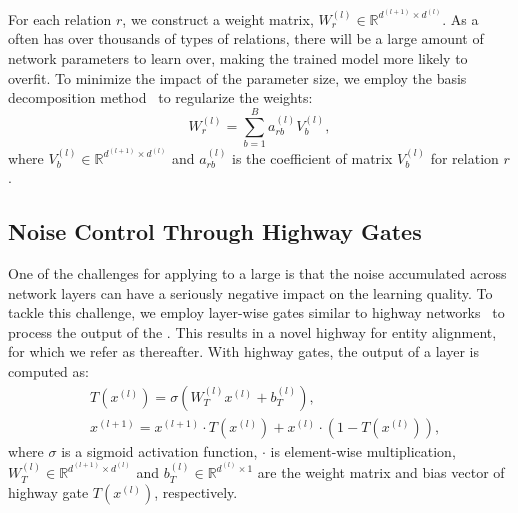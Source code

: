 	
	 For each relation $r$, we construct a weight matrix, $W_r^{(l)} \in \mathbb{R}^{d^{(l+1)}
\times d^{(l)}}$. As a \KG often has over thousands of types of relations, there will be a large amount of network parameters to learn
over, making the trained model more likely to overfit. To minimize the impact of the parameter size, we employ the basis decomposition
method~\cite{Schlichtkrull2017Modeling} to regularize the weights:
	\begin{equation}
	W_r^{(l)}=\sum\limits_{b=1}^B a_{rb}^{(l)}V_b^{(l)},
	\end{equation}
	where $V_b^{(l)} \in \mathbb{R}^{d^{(l+1)} \times d^{(l)}}$ and $a_{rb}^{(l)}$ is the coefficient of matrix $V_b^{(l)}$ for relation $r$.
	
	


	\subsection{Noise Control Through Highway Gates}
	\label{section:hgcn}
One of the challenges for applying \GCNs to a large \KG is that the noise accumulated across network layers can have a seriously negative
impact on the learning quality. To tackle this challenge, we employ layer-wise gates similar to highway
networks~\cite{Srivastava2015Highway} to process the output of the \RGCN. This results in a novel highway \RGCN for entity alignment, for
which we refer as \HRGCN thereafter. With highway gates, the output of a \HRGCN layer is computed as:
%
%
	\begin{equation}
	\begin{split}
	&T(x^{(l)})=\sigma(W_T^{(l)}x^{(l)}+b_T^{(l)}), \\
	&x^{(l+1)}=x^{(l+1)} \cdot T(x^{(l)})+x^{(l)} \cdot (1-T(x^{(l)})),
	\end{split}
	\end{equation}
	where $\sigma$ is a sigmoid activation function, $\cdot$ is element-wise multiplication, $W_T^{(l)} \in \mathbb{R}^{d^{(l+1)} \times
d^{(l)}}$ and $b_T^{(l)} \in \mathbb{R}^{d^{(l)} \times 1}$ are the weight matrix and bias vector of highway gate $T(x^{(l)})$,
respectively.



